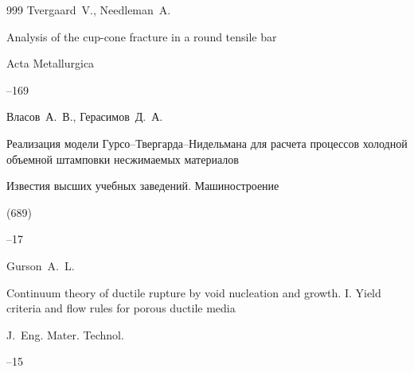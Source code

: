 \begin{thebibliography}{999}
\by Tvergaard~V., Needleman~A. 

\paper Analysis of the cup-cone fracture in a round tensile bar

\jour Acta Metallurgica  




--169





\by Власов~А.~В., Герасимов~Д.~А.

\paper Реализация модели Гурсо–Твергарда–Нидельмана для расчета процессов холодной объемной штамповки несжимаемых материалов

\jour Известия высших учебных заведений. Машиностроение


 (689)

--17













\by Gurson~A.~L. 

\paper Continuum theory of ductile rupture by void nucleation and growth. I. Yield criteria and flow rules for porous ductile media

\jour J.~Eng. Mater. Technol.  




–15






\end{thebibliography}
